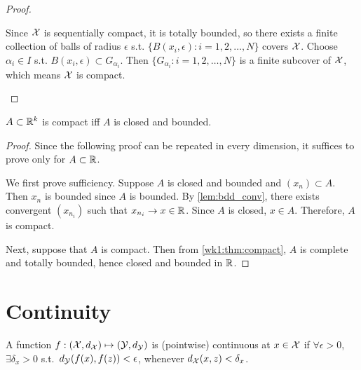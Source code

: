 \documentclass[12pt]{article}
\begin{document}
\begin{proof}
\begin{enumerate}[1)]
Since $\mathcal{X}$ is sequentially compact, it is totally bounded, so there exists a finite collection of balls of radius $\epsilon$ s.t. $\{B(x_i,\epsilon):i=1,2,\ldots,N\}$ covers $\mathcal{X}$. Choose $\alpha_i \in I$ s.t. $B(x_i,\epsilon)\subset G_{\alpha_i}$. Then $\{G_{\alpha_i}:i=1,2,\ldots,N\}$ is a finite subcover of $\mathcal{X}$, which means $\mathcal{X}$ is compact.
\end{enumerate}



\end{proof}

\begin{Theorem}\label{Theorem:Heine-Borel} 
$A \subset \mathbb{R}^k$ is compact iff $A$ is closed and bounded.
\end{Theorem}

\begin{proof} 
Since the following proof can be repeated in every dimension, it suffices to prove only for $A \subset \mathbb{R}$.

We first prove sufficiency. Suppose $A$ is closed and bounded and $(x_n)\subset A$. Then $x_n$ is bounded since $A$ is bounded. By \cref{lem:bdd_conv}, there exists convergent $(x_{n_i})$ such that $x_{n_i}\to x\in\mathbb{R}$. Since $A$ is closed, $x \in A$. Therefore, $A$ is compact.

Next, suppose that $A$ is compact. Then from \cref{wk1:thm:compact}, $A$ is complete and totally bounded, hence closed and bounded in $\mathbb{R}$.

\end{proof}


\section{Continuity}

\begin{Definition}
A function $f: (\mathcal{X}, d_{\mathcal{X}}) \mapsto (\mathcal{Y}, d_{\mathcal{Y}})$ is (pointwise) continuous at $x \in \mathcal{X}$ if $\forall \epsilon>0$, $\exists \delta_x>0$ s.t.\ $d_{\mathcal{Y}}(f(x),f(z))< \epsilon$, whenever $d_{\mathcal{X}}(x,z)<\delta_x$. 
\end{Definition}
\end{document}
